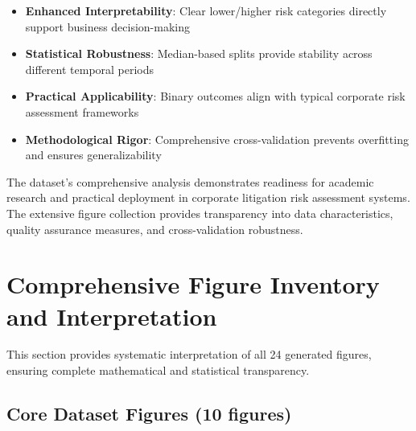 \documentclass[11pt,a4paper]{article}
\begin{document}
\begin{itemize}
\item \textbf{Enhanced Interpretability}: Clear lower/higher risk categories directly support business decision-making
\item \textbf{Statistical Robustness}: Median-based splits provide stability across different temporal periods
\item \textbf{Practical Applicability}: Binary outcomes align with typical corporate risk assessment frameworks
\item \textbf{Methodological Rigor}: Comprehensive cross-validation prevents overfitting and ensures generalizability
\end{itemize}

The dataset's comprehensive analysis demonstrates readiness for academic research and practical deployment in corporate litigation risk assessment systems. The extensive figure collection provides transparency into data characteristics, quality assurance measures, and cross-validation robustness.

\section{Comprehensive Figure Inventory and Interpretation}

This section provides systematic interpretation of all 24 generated figures, ensuring complete mathematical and statistical transparency.

\subsection{Core Dataset Figures (10 figures)}
\end{document}

